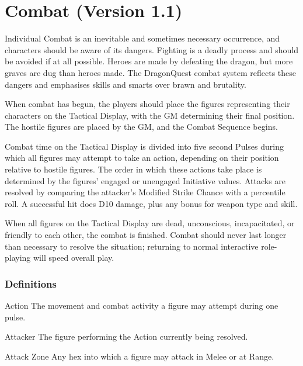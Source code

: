\chapter{Combat (Version 1.1)}
\label{combat}

\begin{multicols*}{3}

Individual Combat is an inevitable and sometimes necessary occurrence,
and characters should be aware of its dangers. Fighting is a deadly
process and should be avoided if at all possible. Heroes are made by
defeating the dragon, but more graves are dug than heroes made. The
DragonQuest combat system reflects these dangers and emphasises skills
and smarts over brawn and brutality.

When combat has begun, the players should place the figures
representing their characters on the Tactical Display, with the GM
determining their final position. The hostile figures are placed by
the GM, and the Combat Sequence begins.

Combat time on the Tactical Display is divided into five second Pulses
during which all figures may attempt to take an action, depending on
their position relative to hostile figures. The order in which these
actions take place is determined by the figures' engaged or unengaged
Initiative values. Attacks are resolved by comparing the attacker's
Modified Strike Chance with a percentile roll. A successful hit does
D10 damage, plus any bonus for weapon type and skill.

When all figures on the Tactical Display are dead, unconscious,
incapacitated, or friendly to each other, the combat is
finished. Combat should never last longer than necessary to resolve
the situation; returning to normal interactive role-playing will speed
overall play.

\subsection{Definitions}

\begin{Description}
\item[Action] The movement and combat activity a figure may attempt during
one pulse.

\item[Attacker] The figure performing the Action currently being resolved.

\item[Attack Zone] Any hex into which a figure may attack in Melee or at
Range.


\end{Description}
\end{multicols*}
